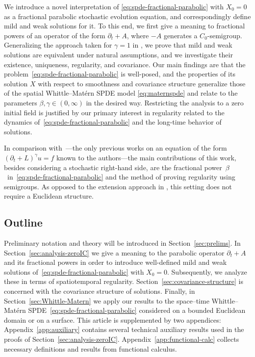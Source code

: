\documentclass[reqno]{amsart}
\numberwithin{equation}{section}
\theoremstyle{remark}
\theoremstyle{definition}
\begin{document}
We introduce a novel interpretation of \eqref{eq:spde-fractional-parabolic} 
with $X_0=0$ 
as a fractional parabolic stochastic evolution equation, 
and correspondingly define mild and weak solutions for it. 
To this end, we first give a meaning to fractional powers 
of an operator of the form $\partial_t + A$, 
where $-A$ generates a $C_0$-semigroup. 
Generalizing the approach taken for $\gamma=1$ 
in \cite[Chapter~5]{DaPrato2014}, 
we prove that mild and weak solutions 
are equivalent 
under natural assumptions, and we investigate 
their existence, uniqueness, 
regularity, and covariance. 
Our main findings are that 
%
the problem~\eqref{eq:spde-fractional-parabolic} 
is well-posed, and 
%
the properties of its solution $X$ 
with respect to  
smoothness   
and covariance structure 
generalize those 
of the spatial Whittle--Mat\'ern SPDE model \eqref{eq:maternspde} and 
relate to the parameters 
$\beta,\gamma\in(0,\infty)$ in the desired way. 
Restricting the analysis to a 
zero initial field is justified 
by our primary interest in 
regularity related to the dynamics 
of~\eqref{eq:spde-fractional-parabolic} and the 
long-time behavior of solutions. 
%

In comparison 
with~\cite{Biswas2021Harnack,Biswas2021,Litsgard2023,Nystrom2016,Stinga2017}---the 
only previous works on an equation 
of the form $(\partial_t + L)^\gamma u = f$ 
known to the authors---the main contributions 
of this work, besides considering 
a stochastic right-hand side, are 
the fractional 
power~$\beta$~in~\eqref{eq:spde-fractional-parabolic}  
and 
the method of proving regularity 
using semigroups. 
As opposed to the extension approach  
in \cite{Biswas2021Harnack,Biswas2021,Litsgard2023,Nystrom2016,Stinga2017}, 
this setting does not require a Euclidean structure. 

\subsection{Outline} 

Preliminary notation and theory will be introduced 
in Section~\ref{sec:prelims}. 
In Section~\ref{sec:analysis-zeroIC} 
we give a meaning to the parabolic operator $\partial_t + A$ 
and its fractional powers in order to introduce 
well-defined mild and 
weak solutions of~\eqref{eq:spde-fractional-parabolic} with ${X_0=0}$.
Subsequently, we analyze these
in terms of spatiotemporal regularity.
Section~\ref{sec:covariance-structure} 
is concerned with 
the covariance structure of solutions. 
Finally, in Section~\ref{sec:Whittle-Matern} 
we apply our results to 
the space--time 
Whittle--Mat\'ern SPDE~\eqref{eq:spde-fractional-parabolic}  
considered on a bounded Euclidean domain 
or on a surface. 
This article is supplemented by two appendices: 
Appendix~\ref{app:auxiliary} contains several technical auxiliary results 
used in the proofs of 
Section~\ref{sec:analysis-zeroIC}.  
Appendix~\ref{app:functional-calc} collects necessary definitions 
and results from functional calculus.  
\end{document}
